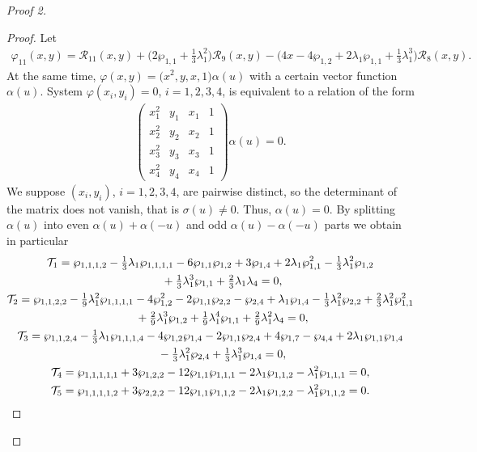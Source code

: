 \documentclass[pdftex]{sigma}
\numberwithin{equation}{section}
\begin{document}
\begin{proof}[Proof 2]
\begin{proof}
Let
\begin{gather*}
 \varphi_{11}(x,y) = \mathcal{R}_{11}(x,y) + \bigl(2\wp_{1,1} + \tfrac{1}{3} \lambda_1^2 \bigr) \mathcal{R}_{9}(x,y) - \bigl(4x - 4\wp_{1,2} + 2\lambda_1\wp_{1,1} + \tfrac{1}{3} \lambda_1^3\bigr) \mathcal{R}_{8}(x,y).
\end{gather*}
At the same time, $\varphi(x,y)=\big(x^2,y,x,1\big)\alpha(u)$ with a certain vector function $\alpha(u)$. System $\varphi(x_i,y_i)=0$, $i=1,2,3,4$, is equivalent to a relation of the form
\begin{gather*}
 \begin{pmatrix}
 x_1^2 & y_1 & x_1 & 1 \\ x_2^2 & y_2 & x_2 & 1\\ x_3^2 & y_3 & x_3 & 1 \\ x_4^2 & y_4 & x_4 & 1
 \end{pmatrix} \alpha (u) = 0.
\end{gather*}
We suppose $(x_i,y_i)$, $i=1,2,3,4$, are pairwise distinct, so the determinant of the matrix does not vanish, that is $\sigma(u)\neq 0$. Thus, $\alpha(u)=0$. By splitting $\alpha (u)$ into even $\alpha (u) + \alpha (-u)$ and odd $\alpha (u) - \alpha (-u)$ parts we obtain in particular
\begin{subequations}
\begin{gather}
\mathcal{T}_1 = \wp_{1,1,1,2} - \tfrac{1}{3} \lambda_1 \wp_{1,1,1,1} - 6 \wp_{1,1}\wp_{1,2} + 3 \wp_{1,4} + 2\lambda_1 \wp_{1,1}^2 - \tfrac{1}{3}\lambda_1^2 \wp_{1,2} \nonumber\\
 \hphantom{\mathcal{T}_1 =}{} + \tfrac{1}{3}\lambda_1^3 \wp_{1,1} + \tfrac{2}{3} \lambda_1 \lambda_4 = 0, \label{EvenRel1C35}\\
\mathcal{T}_2 =\wp_{1,1,2,2} -\tfrac{1}{9} \lambda_1^2 \wp_{1,1,1,1} -4\wp_{1,2}^2
 - 2 \wp_{1,1}\wp_{2,2} -\wp_{2,4} + \lambda_1 \wp_{1,4} - \tfrac{1}{3} \lambda_1^2 \wp_{2,2}
 + \tfrac{2}{3} \lambda_1^2 \wp_{1,1}^2 \notag \\
\hphantom{\mathcal{T}_2 =}{} + \tfrac{2}{9} \lambda_1^3 \wp_{1,2} + \tfrac{1}{9} \lambda_1^4 \wp_{1,1} +\tfrac{2}{9} \lambda_1^2 \lambda_4 = 0,\label{EvenRel2C35}\\
\mathcal{T}_3 =\wp_{1,1,2,4} - \tfrac{1}{3} \lambda_1 \wp_{1,1,1,4} - 4\wp_{1,2}\wp_{1,4} - 2\wp_{1,1}\wp_{2,4} + 4\wp_{1,7} - \wp_{4,4} +2\lambda_1 \wp_{1,1} \wp_{1,4} \notag \\
\hphantom{\mathcal{T}_3 =}{} - \tfrac{1}{3} \lambda_1^2 \wp_{2,4} + \tfrac{1}{3} \lambda_1^3 \wp_{1,4} = 0, \label{EvenRel3C35}\\
\mathcal{T}_4 = \wp_{1,1,1,1,1} + 3\wp_{1,2,2} - 12\wp_{1,1}\wp_{1,1,1} -2\lambda_1 \wp_{1,1,2} - \lambda_1^2 \wp_{1,1,1} = 0, \label{OddRel1C35} \\
\mathcal{T}_5 = \wp_{1,1,1,1,2} + 3\wp_{2,2,2} - 12\wp_{1,1}\wp_{1,1,2} -2\lambda_1 \wp_{1,2,2} - \lambda_1^2 \wp_{1,1,2} = 0.\label{OddRel2C35}
\end{gather}
\end{subequations}


\end{proof}
\end{proof}
\end{document}
